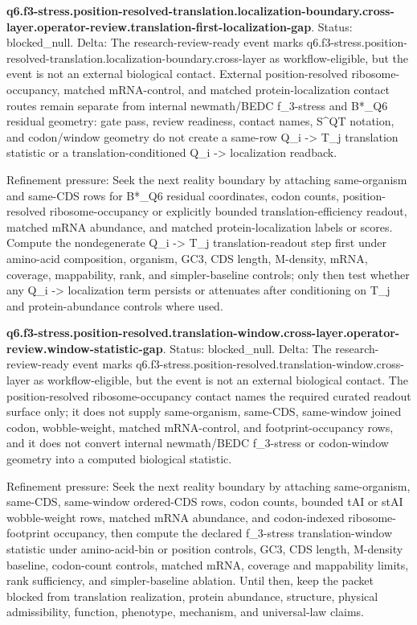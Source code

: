\textbf{q6.f3-stress.position-resolved-translation.localization-boundary.cross-layer.operator-review.translation-first-localization-gap}. Status: blocked\_null. Delta: The research-review-ready event marks q6.f3-stress.position-resolved-translation.localization-boundary.cross-layer as workflow-eligible, but the event is not an external biological contact. External position-resolved ribosome-occupancy, matched mRNA-control, and matched protein-localization contact routes remain separate from internal newmath/BEDC f\_3-stress and B*\_Q6 residual geometry: gate pass, review readiness, contact names, S\textasciicircum{}QT notation, and codon/window geometry do not create a same-row Q\_i -> T\_j translation statistic or a translation-conditioned Q\_i -> localization readback.

Refinement pressure: Seek the next reality boundary by attaching same-organism and same-CDS rows for B*\_Q6 residual coordinates, codon counts, position-resolved ribosome-occupancy or explicitly bounded translation-efficiency readout, matched mRNA abundance, and matched protein-localization labels or scores. Compute the nondegenerate Q\_i -> T\_j translation-readout step first under amino-acid composition, organism, GC3, CDS length, M-density, mRNA, coverage, mappability, rank, and simpler-baseline controls; only then test whether any Q\_i -> localization term persists or attenuates after conditioning on T\_j and protein-abundance controls where used.

\textbf{q6.f3-stress.position-resolved.translation-window.cross-layer.operator-review.window-statistic-gap}. Status: blocked\_null. Delta: The research-review-ready event marks q6.f3-stress.position-resolved.translation-window.cross-layer as workflow-eligible, but the event is not an external biological contact. The position-resolved ribosome-occupancy contact names the required curated readout surface only; it does not supply same-organism, same-CDS, same-window joined codon, wobble-weight, matched mRNA-control, and footprint-occupancy rows, and it does not convert internal newmath/BEDC f\_3-stress or codon-window geometry into a computed biological statistic.

Refinement pressure: Seek the next reality boundary by attaching same-organism, same-CDS, same-window ordered-CDS rows, codon counts, bounded tAI or stAI wobble-weight rows, matched mRNA abundance, and codon-indexed ribosome-footprint occupancy, then compute the declared f\_3-stress translation-window statistic under amino-acid-bin or position controls, GC3, CDS length, M-density baseline, codon-count controls, matched mRNA, coverage and mappability limits, rank sufficiency, and simpler-baseline ablation. Until then, keep the packet blocked from translation realization, protein abundance, structure, physical admissibility, function, phenotype, mechanism, and universal-law claims.

